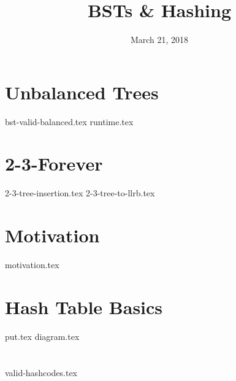 \documentclass[11pt]{exam}
\title{BSTs \& Hashing}
\date{March 21, 2018}
\begin{document}
\maketitle

\section{Unbalanced Trees}
\begin{questions}
{bst-valid-balanced.tex}
{runtime.tex}
\end{questions}

\section{2-3-Forever}
\begin{questions}
{2-3-tree-insertion.tex}
{2-3-tree-to-llrb.tex}
\end{questions}

\section{Motivation}
\begin{questions}
{motivation.tex}
\end{questions}

\section{Hash Table Basics}
\begin{questions}
{put.tex}
{diagram.tex}
\end{questions}

\section{}
\begin{questions}
{valid-hashcodes.tex}
\end{questions}
\end{document}
